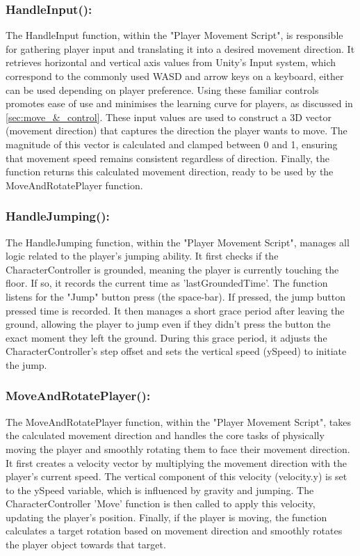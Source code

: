 \documentclass{l4proj}
\begin{document}
\subsubsection{HandleInput():}
The HandleInput function, within the "Player Movement Script", is responsible for gathering player input and translating it into a desired movement direction. It retrieves horizontal and vertical axis values from Unity's Input system, which correspond to the commonly used WASD and arrow keys on a keyboard, either can be used depending on player preference. Using these familiar controls promotes ease of use and minimises the learning curve for players, as discussed in \ref{sec:move_&_control}. These input values are used to construct a 3D vector (movement direction) that captures the direction the player wants to move. The magnitude of this vector is calculated and clamped between 0 and 1, ensuring that movement speed remains consistent regardless of direction. Finally, the function returns this calculated movement direction, ready to be used by the MoveAndRotatePlayer function.

\subsubsection{HandleJumping():}
The HandleJumping function, within the "Player Movement Script", manages all logic related to the player's jumping ability. It first checks if the CharacterController is grounded, meaning the player is currently touching the floor. If so, it records the current time as 'lastGroundedTime'. The function listens for the "Jump" button press (the space-bar). If pressed, the jump button pressed time is recorded. It then manages a short grace period after leaving the ground, allowing the player to jump even if they didn't press the button the exact moment they left the ground. During this grace period, it adjusts the CharacterController's step offset and sets the vertical speed (ySpeed) to initiate the jump.

\subsubsection{MoveAndRotatePlayer():}
The MoveAndRotatePlayer function, within the "Player Movement Script", takes the calculated movement direction and handles the core tasks of physically moving the player and smoothly rotating them to face their movement direction. It first creates a velocity vector by multiplying the movement direction with the player's current speed. The vertical component of this velocity (velocity.y) is set to the ySpeed variable, which is influenced by gravity and jumping. The  CharacterController 'Move' function is then called to apply this velocity, updating the player's position. Finally, if the player is moving, the function calculates a target rotation based on movement direction and smoothly rotates the player object towards that target.
\end{document}

